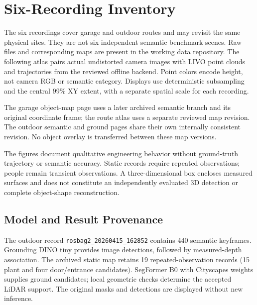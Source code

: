 \section{Six-Recording Inventory}
\begin{table}[h!]
\centering
\caption{Existing recordings and archived reviewed-map geometry. Path length is estimated from trajectories, not ground truth. Point counts refer to the full source maps before display subsampling.}

\end{table}

The six recordings cover garage and outdoor routes and may revisit the same physical sites. They are not six independent semantic benchmark scenes. Raw files and corresponding maps are present in the working data repository. The following atlas pairs actual undistorted camera images with LIVO point clouds and trajectories from the reviewed offline backend. Point colors encode height, not camera RGB or semantic category. Displays use deterministic subsampling and the central 99\% XY extent, with a separate spatial scale for each recording.

The garage object-map page uses a later archived semantic branch and its original coordinate frame; the route atlas uses a separate reviewed map revision. The outdoor semantic and ground pages share their own internally consistent revision. No object overlay is transferred between these map versions.

The figures document qualitative engineering behavior without ground-truth trajectory or semantic accuracy. Static records require repeated observations; people remain transient observations. A three-dimensional box encloses measured surfaces and does not constitute an independently evaluated 3D detection or complete object-shape reconstruction.

\subsection{Model and Result Provenance}
The outdoor record \texttt{rosbag2\_20260415\_162852} contains 440 semantic keyframes. Grounding DINO tiny provides image detections, followed by measured-depth association. The archived static map retains 19 repeated-observation records (15 plant and four door/entrance candidates). SegFormer B0 with Cityscapes weights supplies ground candidates; local geometric checks determine the accepted LiDAR support. The original masks and detections are displayed without new inference.

